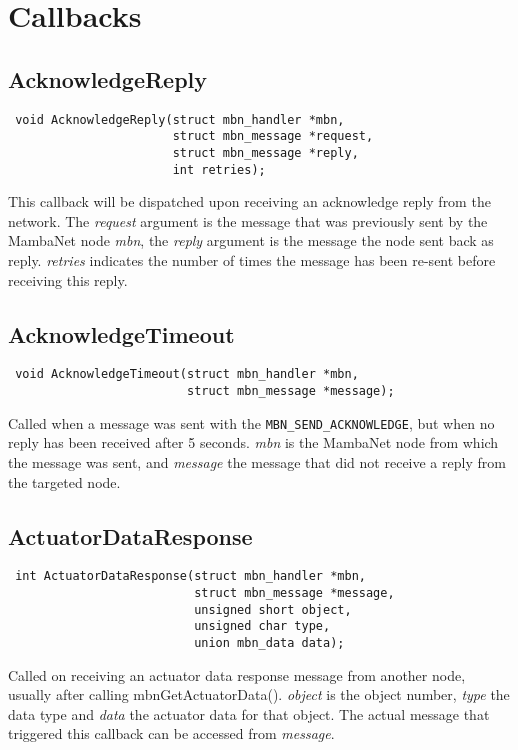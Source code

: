 \cleardoublepage
\section{Callbacks}
\label{sec:cb}

\subsection{AcknowledgeReply}
\begin{verbatim}
 void AcknowledgeReply(struct mbn_handler *mbn,
                       struct mbn_message *request,
                       struct mbn_message *reply,
                       int retries);
\end{verbatim}
This callback will be dispatched upon receiving an acknowledge reply from the network. The \textit{request} argument is the message that was previously sent by the MambaNet node \textit{mbn}, the \textit{reply} argument is the message the node sent back as reply. \textit{retries} indicates the number of times the message has been re-sent before receiving this reply.


\subsection{AcknowledgeTimeout}
\begin{verbatim}
 void AcknowledgeTimeout(struct mbn_handler *mbn,
                         struct mbn_message *message);
\end{verbatim}
Called when a message was sent with the \verb|MBN_SEND_ACKNOWLEDGE|, but when no reply has been received after 5 seconds. \textit{mbn} is the MambaNet node from which the message was sent, and \textit{message} the message that did not receive a reply from the targeted node.


\subsection{ActuatorDataResponse}
\begin{verbatim}
 int ActuatorDataResponse(struct mbn_handler *mbn,
                          struct mbn_message *message,
                          unsigned short object,
                          unsigned char type,
                          union mbn_data data);
\end{verbatim}
Called on receiving an actuator data response message from another node, usually after calling mbnGetActuatorData(). \textit{object} is the object number, \textit{type} the data type and \textit{data} the actuator data for that object. The actual message that triggered this callback can be accessed from \textit{message}.

